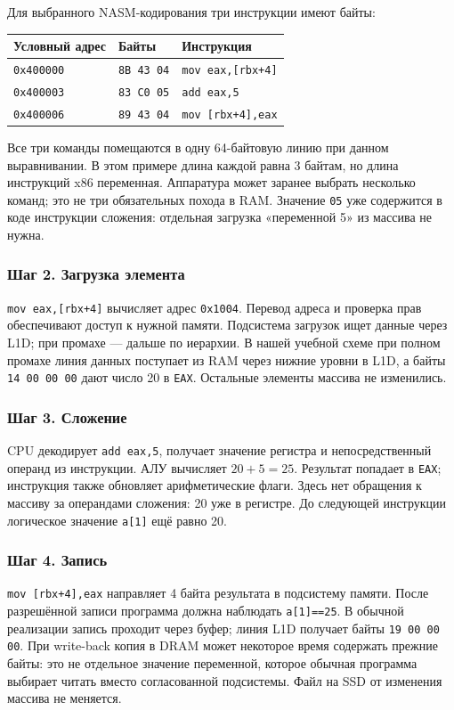 Для выбранного NASM-кодирования три инструкции имеют байты:
\begin{center}
\small
\begin{tabular}{|l|l|l|}
\hline
Условный адрес & Байты & Инструкция \\
\hline
\texttt{0x400000} & \texttt{8B 43 04} & \texttt{mov eax,[rbx+4]} \\
\texttt{0x400003} & \texttt{83 C0 05} & \texttt{add eax,5} \\
\texttt{0x400006} & \texttt{89 43 04} & \texttt{mov [rbx+4],eax} \\
\hline
\end{tabular}
\end{center}
Все три команды помещаются в одну 64-байтовую линию при данном выравнивании.
В этом примере длина каждой равна 3 байтам, но длина инструкций x86 переменная.
Аппаратура может заранее выбрать несколько команд; это не три обязательных
похода в RAM. Значение \texttt{05} уже содержится в коде инструкции сложения:
отдельная загрузка «переменной 5» из массива не нужна.

\subsubsection*{Шаг 2. Загрузка элемента}
\texttt{mov eax,[rbx+4]} вычисляет адрес \texttt{0x1004}. Перевод адреса
и проверка прав обеспечивают доступ к нужной памяти. Подсистема загрузок
ищет данные через L1D; при промахе --- дальше по иерархии.
В нашей учебной схеме при полном промахе линия данных поступает из RAM
через нижние уровни в L1D, а байты \texttt{14 00 00 00} дают число 20
в \texttt{EAX}. Остальные элементы массива не изменились.

\subsubsection*{Шаг 3. Сложение}
CPU декодирует \texttt{add eax,5}, получает значение регистра и непосредственный
операнд из инструкции. АЛУ вычисляет $20+5=25$. Результат попадает в
\texttt{EAX}; инструкция также обновляет арифметические флаги.
Здесь нет обращения к массиву за операндами сложения: 20 уже в регистре.
До следующей инструкции логическое значение \texttt{a[1]} ещё равно 20.

\subsubsection*{Шаг 4. Запись}
\texttt{mov [rbx+4],eax} направляет 4 байта результата в подсистему памяти.
После разрешённой записи программа должна наблюдать \texttt{a[1]==25}.
В обычной реализации запись проходит через буфер; линия L1D получает
байты \texttt{19 00 00 00}. При write-back копия в DRAM может некоторое
время содержать прежние байты: это не отдельное значение переменной,
которое обычная программа выбирает читать вместо согласованной подсистемы.
Файл на SSD от изменения массива не меняется.

